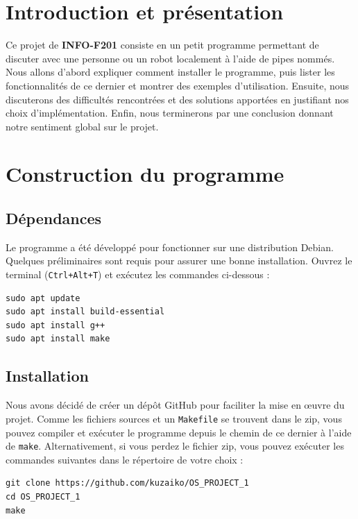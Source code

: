 \documentclass{article}
\begin{document}
\newpage

\section{Introduction et présentation}
\label{introduction-et-presentation}

Ce projet de \textbf{INFO-F201} consiste en un petit programme permettant de discuter avec une personne ou un robot localement à l'aide de pipes nommés. 
Nous allons d'abord expliquer comment installer le programme, puis lister les fonctionnalités de ce dernier et montrer des exemples d'utilisation. 
Ensuite, nous discuterons des difficultés rencontrées et des solutions apportées en justifiant nos choix d'implémentation. 
Enfin, nous terminerons par une conclusion donnant notre sentiment global sur le projet.

\section{Construction du programme}
\label{construction-du-programme}


\subsection{Dépendances}
\label{Dépendances}
Le programme a été développé pour fonctionner sur une distribution Debian. 
Quelques préliminaires sont requis pour assurer une bonne installation. 
Ouvrez le terminal (\texttt{Ctrl+Alt+T}) et exécutez les commandes ci-dessous :

\begin{verbatim}
sudo apt update
sudo apt install build-essential
sudo apt install g++
sudo apt install make
\end{verbatim}

\subsection{Installation}
\label{Installation}
Nous avons décidé de créer un dépôt GitHub pour faciliter la mise en œuvre du projet. 
Comme les fichiers sources et un \texttt{Makefile} se trouvent dans le zip, vous pouvez compiler et exécuter le programme depuis le chemin de ce dernier à l'aide de \texttt{make}. 
Alternativement, si vous perdez le fichier zip, vous pouvez exécuter les commandes suivantes dans le répertoire de votre choix :

\begin{verbatim}
git clone https://github.com/kuzaiko/OS_PROJECT_1
cd OS_PROJECT_1
make
\end{verbatim}
\end{document}
